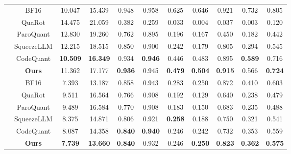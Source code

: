 \documentclass{article}
\begin{document}
\begin{table}[!t]
{\begin{tabular}{c|c|cc|cccccc|c}
    & BF16       & 10.047 & 15.439 & 0.948 & 0.958 & 0.625 & 0.646 & 0.921 & 0.732 & 0.805 \\
    & QuaRot     & 14.475 & 21.059 & 0.382 & 0.259 & 0.033 & 0.004 & 0.037 & 0.003 & 0.120 \\
    & ParoQuant  & 12.830 & 19.260 & 0.762 & 0.895 & 0.196 & 0.167 & 0.450 & 0.182 & 0.442 \\
    & SqueezeLLM & 12.215 & 18.515 & 0.850 & 0.900 & 0.242 & 0.179 & 0.805 & 0.294 & 0.545 \\
    & CodeQuant  & \textbf{10.509} & \textbf{16.349} & 0.934 & \textbf{0.946} & 0.446 & 0.483 & 0.895 & \textbf{0.589} & 0.716 \\
    & \textbf{Ours}
                 & 11.362
                 & 17.177
                 & \textbf{0.936}
                 & 0.945
                 & \textbf{0.479}
                 & \textbf{0.504}
                 & \textbf{0.915}
                 & 0.566
                 & \textbf{0.724} \\

    \cmidrule(lr){1-11}
    
& BF16 & 7.393 & 13.187 & 0.858 & 0.943 & 0.283 & 0.250 & 0.872 & 0.410 & 0.603 \\
& QuaRot & 9.511 & 16.564 & 0.766 & 0.908 & 0.192 & 0.129 & 0.640 & 0.238 & 0.479 \\
& ParoQuant & 9.489 & 16.584 & 0.770 & 0.908 & 0.183 & 0.150 & 0.683 & 0.235 & 0.488 \\
& SqueezeLLM & 8.375 & 14.871 & 0.806 & 0.921 & \textbf{0.258} & 0.188 & 0.750 & 0.321 & 0.541 \\
& CodeQuant & 8.087 & 14.358 & \textbf{0.840} & \textbf{0.940} & 0.246 & 0.242 & 0.732 & 0.353 & 0.559 \\
& \textbf{Ours}
& \textbf{7.739}
& \textbf{13.660}
& \textbf{0.840}
& 0.932
& 0.246
& \textbf{0.250}
& \textbf{0.823}
& \textbf{0.362}
& \textbf{0.575} \\
    
    \bottomrule
            
\end{tabular}
}
\label{tab:eval:main}
\par\vspace{-10pt}
\end{table}
\end{document}
